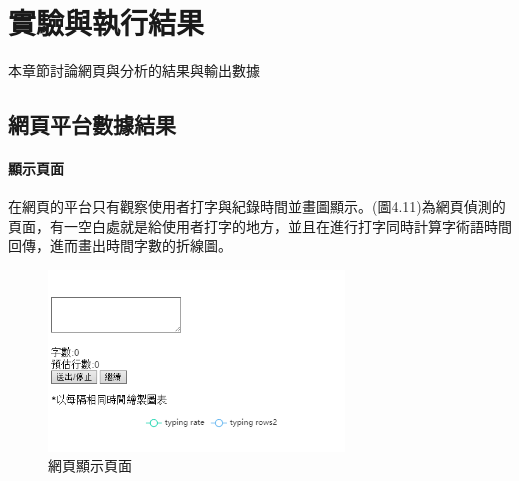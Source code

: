\chapter{實驗與執行結果}
本章節討論網頁與分析的結果與輸出數據
\section{網頁平台數據結果}
\subsubsection{顯示頁面}
在網頁的平台只有觀察使用者打字與紀錄時間並畫圖顯示。(圖4.11)為網頁偵測的頁面，有一空白處就是給使用者打字的地方，並且在進行打字同時計算字術語時間回傳，進而畫出時間字數的折線圖。
	\begin{figure}[H] 
	\centering 
	\includegraphics[width=0.7\textwidth]{4_1.png} 
	\caption{網頁顯示頁面} 
	\label{Fig.4.1} 
	\end{figure}
